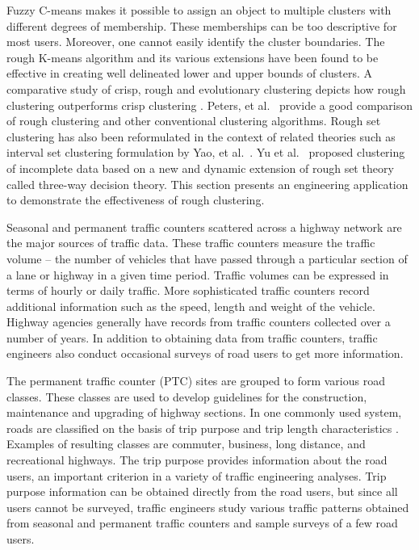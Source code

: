 \documentclass[oribibl]{llncs}
\begin{document}
Fuzzy C-means makes it possible to assign an object to multiple clusters
with different degrees of membership.
These memberships can be too descriptive for most users.
Moreover, one cannot easily identify the cluster boundaries.
The rough K-means \cite{LingrasWest2004} algorithm and its various 
extensions \cite{Mitra2004,Peters2006} have been found to be effective in creating
well delineated lower and upper bounds of clusters.
A comparative study of crisp, rough and evolutionary clustering depicts how rough 
clustering outperforms crisp clustering \cite{JoshiLingras2009}. 
Peters, et al.~\cite{PetersEtAl2013} provide a good comparison of rough clustering
and other conventional clustering algorithms.
Rough set clustering has also been reformulated in the context of related theories
such as interval set clustering formulation by Yao, et al.~\cite{yao2009interval}.
Yu et al.~\cite{yu2014three,yu2016tree} proposed clustering of incomplete data
based on a new and dynamic extension of rough set theory called three-way decision theory.
This section presents an engineering application to demonstrate
the effectiveness of rough clustering. 


Seasonal and permanent traffic counters
scattered across a highway network
are the major sources of
traffic data.
These traffic counters measure the
traffic volume -- the number of
vehicles that have passed
through a particular section
of a lane or highway in a
given time period.
Traffic volumes can be
expressed in terms of
hourly or daily traffic.
More sophisticated traffic
counters record additional
information such as the speed,
length and weight of the vehicle.
Highway agencies generally have
records from traffic counters
collected over a number of years.
In addition to obtaining data
from traffic counters,
traffic engineers also conduct
occasional surveys of road users
to get more information.

The permanent traffic counter (PTC)
sites are grouped
to form various road classes.
These classes are used to develop
guidelines for the construction,
maintenance and upgrading
of highway sections.
In one commonly used system,
roads are classified on the
basis of trip purpose and
trip length characteristics
\cite{SharmaWerner}.
Examples of resulting classes
are commuter, business, long distance,
and recreational highways.
The trip purpose provides information
about the road users,
an important criterion in a
variety of traffic engineering analyses.
Trip purpose information can be
obtained directly from the road users,
but since all users cannot be surveyed,
traffic engineers study various traffic
patterns obtained from seasonal and
permanent traffic counters and
sample surveys of a few road users.
\end{document}
